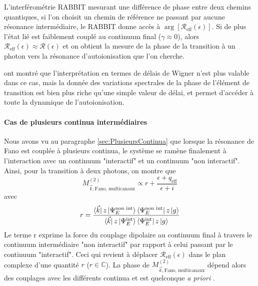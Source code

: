 L'interférométrie RABBIT mesurant une différence de phase entre deux chemins quantiques, si l'on choisit un chemin de référence ne passant par aucune résonance intermédiaire, le RABBIT donne accès à $\arg [\mathcal{R}_{\text{eff}}(\epsilon)]$. Si de plus l'état lié est faiblement couplé au continuum final ($\gamma \approx 0$), alors $\mathcal{R}_{\text{eff}}(\epsilon) \approx \mathcal{R}(\epsilon)$ et on obtient la mesure de la phase de la transition à un photon vers la résonance d'autoionisation que l'on cherche. 

 ont montré que l'interprétation en termes de délais de Wigner n'est plus valable dans ce cas, mais la donnée des variations spectrales de la phase de l'élément de transition est bien plus riche qu'une simple valeur de délai, et permet d'accéder à toute la dynamique de l'autoionisation.

\paragraph*{Cas de plusieurs continua intermédiaires} Nous avons vu au paragraphe \ref{sec:PlusieursContinua} que lorsque la résonance de Fano est couplée à plusieurs continua, le système se ramène finalement à l'interaction avec un continuum "interactif" et un continuum "non interactif". Ainsi, pour la transition à deux photons, on montre que
\begin{equation}
M_{\vec{k}, \text{Fano, multicanaux}}^{(2)} \propto r + \frac{\epsilon + q_{\text{eff}}}{\epsilon + i}
\end{equation}
avec 
\begin{equation}
r = \frac{\bra{\vec{k}} z \ket{\Psi_E^{\text{non int}}} \bra{\Psi_E^{\text{non int}}} z \ket{g}}{\bra{\vec{k}} z \ket{\Psi_E^{\text{int}}} \bra{\Psi_E^{\text{int}}} z \ket{g}}
\end{equation}
Le terme r exprime la force du couplage dipolaire au continuum final à travers le continuum intermédiaire "non interactif" par rapport à celui passant par le continuum "interactif". Ceci qui revient à déplacer $\mathcal{R}_{\text{eff}}(\epsilon)$ dans le plan complexe d'une quantité $r$ ($r \in \mathbb{C}$). La phase de $M_{\vec{k}, \text{Fano, multicanaux}}^{(2)}$ dépend alors des couplages avec les différents continua et est quelconque \textit{a priori} .

